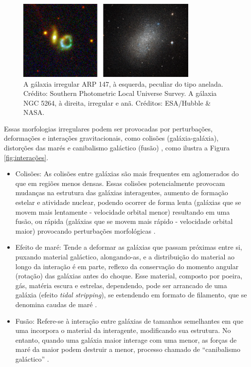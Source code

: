 \begin{figure}[!h] 
  \centering 
  \includegraphics[width=0.8\textwidth]{Imagens/irregulares.png} 
  \caption[Gálaxia ARP 147 e gálaxia NGC 5264.]{A gálaxia irregular ARP 147, à esquerda, peculiar do tipo anelada. Crédito: Southern Photometric Local Universe Survey. A gálaxia NGC 5264, à direita, irregular e anã. Créditos: ESA/Hubble \& NASA.}
  \label{fig:irregulares} 
\end{figure}

Essas morfologias irregulares podem ser provocadas por perturbações, deformações e interações gravitacionais, como colisões (galáxia-galáxia), distorções das marés e canibalismo galáctico (fusão) \cite{2023Muller, 2022gastao}, como ilustra a Figura \ref{fig:interações}.

\begin{itemize}
	\item Colisões: As colisões entre galáxias são mais frequentes em aglomerados do que em regiões menos densas. Essas colisões potencialmente provocam mudanças na estrutura das galáxias interagentes, aumento de formação estelar e atividade nuclear, podendo ocorrer de forma lenta (galáxias que se movem mais lentamente - velocidade orbital menor) resultando em uma fusão, ou rápida  (galáxias que se movem mais rápido - velocidade orbital maior) provocando perturbações morfológicas \cite{2023Muller}.
	\item Efeito de maré: Tende a deformar as galáxias que passam próximas entre si, puxando material galáctico, alongando-as, e a distribuição do material ao longo da interação é em parte, reflexo da conservação do momento angular (rotação) das galáxias antes do choque. Esse material, composto por poeira, gás, matéria escura e estrelas, dependendo, pode ser arrancado de uma galáxia (efeito \emph{tidal stripping}), se estendendo em formato de filamento, que se denomina caudas de maré \cite{2023Kepler, 2023Muller}. 
	\item Fusão: Refere-se à interação entre galáxias de tamanhos semelhantes em que uma incorpora o material da interagente, modificando sua estrutura. No entanto, quando uma galáxia maior interage com uma menor, as forças de maré da maior podem destruir a menor, processo chamado de ``canibalismo galáctico'' \cite{2023Muller}.
\end{itemize}

